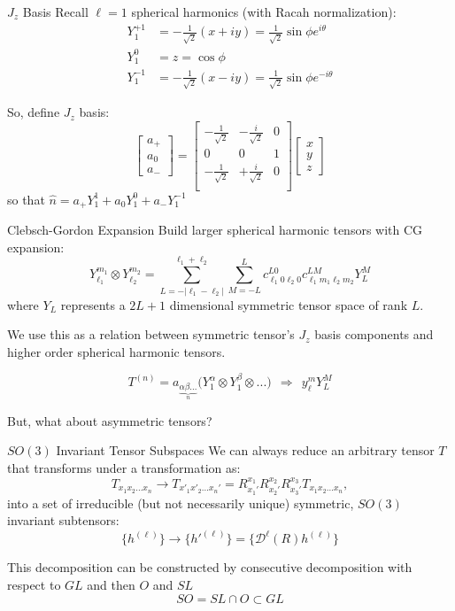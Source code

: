 \documentclass[11pt]{beamer}
\begin{document}
\begin{frame}{$J_z$ Basis}
Recall $\ell=1$ spherical harmonics (with Racah normalization):
\begin{align*}
Y_1^{+1} &= -\frac{1}{\sqrt{2}}(x+iy)=\frac{1}{\sqrt{2}}\sin \phi e^{i\theta}\\
Y_1^{0}\ \ &= z = \cos \phi\\
Y_1^{-1} &= -\frac{1}{\sqrt{2}}(x-iy)=\frac{1}{\sqrt{2}}\sin \phi e^{-i\theta}
\end{align*}
\begin{center}
So, define $J_z$ basis:
$$
\begin{bmatrix}
a_+ \\
a_0 \\
a_-
\end{bmatrix}=\begin{bmatrix}
-\frac{1}{\sqrt{2}} & -\frac{i}{\sqrt{2}} & 0\\
 0 & 0 & 1\\
-\frac{1}{\sqrt{2}} & +\frac{i}{\sqrt{2}} & 0\\
\end{bmatrix}\begin{bmatrix}
x \\
y \\
z
\end{bmatrix}
$$
so that $\hat{n}=a_+ Y_1^1 + a_0 Y_1^0 + a_- Y_1^{-1}$
\end{center}
\end{frame}
\begin{frame}{Clebsch-Gordon Expansion}
Build larger spherical harmonic tensors with CG expansion:
$$
Y_{\ell_1}^{m_1}\otimes Y_{\ell_2}^{m_2} = \sum_{L=-|\ell_1-\ell_2|}^{\ell_1+\ell_2}\sum_{M=-L}^{L}c_{\ell_1 0 \ell_2 0}^{L0}c_{\ell_1 m_1 \ell_2 m_2}^{LM}Y_{L}^M
$$
where $Y_{L}$ represents a $2L+1$ dimensional symmetric tensor space of rank $L$. 

We use this as a relation between symmetric tensor's $J_z$ basis components and higher order spherical harmonic tensors. 

$$ 
T^{(n)} = a_{\underbrace{\alpha\beta...}_n}\big(Y_1^\alpha \otimes Y_1^\beta\otimes ... \big)\ \  \Rightarrow\ \  y_\ell^m Y_L^M
$$

\begin{center}
But, what about asymmetric tensors?
\end{center}
\end{frame}
\begin{frame}{$SO(3)$ Invariant Tensor Subspaces}
We can always reduce an arbitrary tensor $T$ that transforms under a transformation as:
$$
T_{x_1x_2...x_n}\rightarrow T_{x'_1x'_2...x_n'}=R_{x_1'}^{x_1} R_{x_2'}^{x_2} R_{x_3'}^{x_3}T_{x_1x_2...x_n},
$$
into a set of irreducible (but not necessarily unique) symmetric, $SO(3)$ invariant subtensors:
$$
\lbrace h^{(\ell)}\rbrace \rightarrow \lbrace h'^{(\ell)}\rbrace = \lbrace \mathcal{D}^{\ell}(R) h^{(\ell)}\rbrace
$$

This decomposition can be constructed by consecutive decomposition with respect to $GL$ and then $O$ and $SL$
$$
SO= SL\cap O \subset GL
$$
\end{frame}
\end{document}
